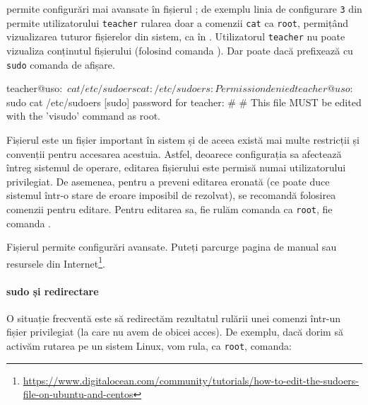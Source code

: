  permite configurări mai avansate în fișierul ; de exemplu linia
de configurare \texttt{3} din  permite utilizatorului \texttt{teacher} rularea doar a comenzii \texttt{cat}
ca \texttt{root}, permițând vizualizarea tuturor fișierelor din sistem, ca în . Utilizatorul \texttt{teacher} nu poate vizualiza conținutul fișierului  (folosind comanda ). Dar poate dacă prefixează cu \texttt{sudo} comanda de afișare.

\begin{screen}[caption={Rularea unei comenzi privilegiate cu sudo},label={lst:user:sudo-command}]
teacher@uso:~$ cat /etc/sudoers
cat: /etc/sudoers: Permission denied
teacher@uso:~$ sudo cat /etc/sudoers
[sudo] password for teacher:
#
# This file MUST be edited with the 'visudo' command as root.
\end{screen}

Fișierul  este un fișier important în sistem și de aceea există mai
multe restricții și convenții pentru accesarea acestuia. Astfel, deoarece
configurația sa afectează întreg sistemul de operare, editarea fișierului este
permisă numai utilizatorului privilegiat. De asemenea, pentru a preveni editarea
eronată (ce poate duce sistemul într-o stare de eroare imposibil de rezolvat),
se recomandă folosirea comenzii  pentru editare. Pentru editarea sa, fie
rulăm comanda  ca \texttt{root}, fie comanda .

\begin{note}
Fișierul  permite configurări avansate. Puteți parcurge pagina de manual  sau resursele din Internet\footnote{\url{https://www.digitalocean.com/community/tutorials/how-to-edit-the-sudoers-file-on-ubuntu-and-centos}}.
\end{note}

\paragraph{sudo și redirectare}

O situație frecventă este să redirectăm rezultatul rulării unei comenzi într-un fișier privilegiat (la
care nu avem de obicei acces). De exemplu, dacă dorim să activăm rutarea pe un
sistem Linux, vom rula, ca \texttt{root}, comanda:


